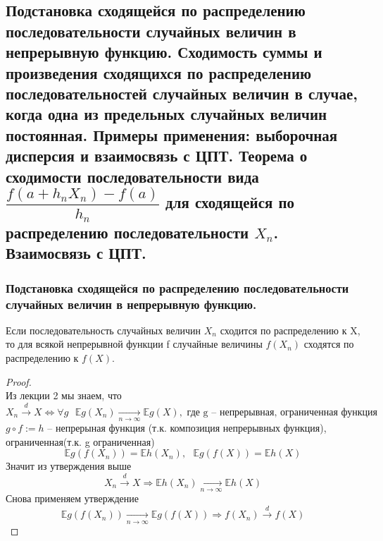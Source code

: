 	\subsection{Подстановка сходящейся по распределению последовательности случайных величин в непрерывную функцию. Сходимость суммы и произведения сходящихся по распределению последовательностей случайных величин в случае, когда одна из предельных случайных величин постоянная. Примеры применения: выборочная дисперсия и взаимосвязь с ЦПТ. Теорема о сходимости последовательности вида $\dfrac{f(a + h_n X_n) - f(a)}{h_n}$ для сходящейся по распределению последовательности $X_n$. Взаимосвязь с ЦПТ.}
	\subsubsection{Подстановка сходящейся по распределению последовательности случайных величин в непрерывную функцию.}
	\begin{theorem*}
		Если последовательность случайных величин $ X_n $ сходится по распределению к X, то для всякой непрерывной функции f случайные величины $  f(X_n) $ сходятся по распределению к $ f(X) $.
	\end{theorem*}
	\begin{proof}
		\text{ }\\
		Из лекции 2 мы знаем, что
		$$ X_n\xrightarrow{d} X \Leftrightarrow \forall g\text{ }\mathbb{E}g(X_n)\xrightarrow[n\to\infty]{}\mathbb{E}g(X),\text{ где g -- непрерывная, ограниченная функция}$$
	$ g\circ f:= h $ -- непрерыная функция (т.к. композиция непрерывных функция), ограниченная(т.к. g ограниченная)
	$$\mathbb{E}g(f(X_n)) = \mathbb{E}h(X_n),\text{ }\mathbb{E}g(f(X)) = \mathbb{E}h(X)$$
	Значит из утверждения выше
	$$X_n\xrightarrow{d} X \Rightarrow \mathbb{E}h(X_n)\xrightarrow[n\to\infty]{}\mathbb{E}h(X)$$
	Снова применяем утверждение
	$$\mathbb{E}g(f(X_n))\xrightarrow[n\to\infty]{}\mathbb{E}g(f(X)) \Rightarrow f(X_n)\xrightarrow{d} f(X) $$
	\end{proof}
